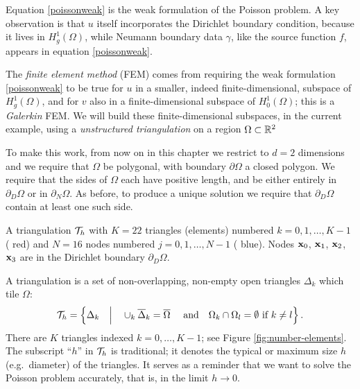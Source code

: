 Equation \eqref{poissonweak} is the weak formulation of the Poisson problem.  A key observation is that $u$ itself incorporates the Dirichlet boundary condition, because it lives in $H_g^1(\Omega)$, while Neumann boundary data $\gamma$, like the source function $f$, appears in equation \eqref{poissonweak}.

The \emph{finite element method} (FEM) comes from requiring the weak formulation  \eqref{poissonweak} to be true for $u$ in a smaller, indeed finite-dimensional, subspace of $H_g^1(\Omega)$, and for $v$ also in a finite-dimensional subspace of $H_0^1(\Omega)$; this is a \emph{Galerkin} FEM.  We will build these finite-dimensional subspaces, in the current example, using a \emph{unstructured triangulation} on a region $\Omega\subset \mathbb{R}^2$

To make this work, from now on in this chapter we restrict to $d=2$ dimensions and we require that $\Omega$ be polygonal, with boundary $\partial\Omega$ a closed polygon.  We require that the sides of $\Omega$ each have positive length, and be either entirely in $\partial_D\Omega$ or in $\partial_N\Omega$.  As before, to produce a unique solution we require that $\partial_D\Omega$ contain at least one such side.

\begin{marginfigure}

\caption{A triangulation $\mathcal{T}_h$ with $K=22$ triangles (elements) numbered $k=0,1,\dots,K-1$ ({\color{red} red}) and $N=16$ nodes numbered $j=0,1,\dots,N-1$  ({\color{blue} blue}).  Nodes $\mathbf{x}_0$, $\mathbf{x}_1$, $\mathbf{x}_2$, $\mathbf{x}_3$ are in the Dirichlet boundary $\partial_D\Omega$.}
\label{fig:number-elements}
\end{marginfigure}

A triangulation is a set of non-overlapping, non-empty open triangles $\Delta_k$ which tile $\Omega$:
\begin{equation*}
\mathcal{T}_h = \left\{\Delta_k \quad\Big|\quad \cup_k \overline{\Delta}_k = \overline{\Omega} \quad \text{ and} \quad \Omega_k \cap \Omega_l = \emptyset \text{ if } k\ne l\right\}.
\end{equation*}
There are $K$ triangles indexed $k=0,\dots,K-1$; see Figure \ref{fig:number-elements}.  The subscript ``$h$'' in $\mathcal{T}_h$ is traditional; it denotes the typical or maximum size $h$ (e.g.~diameter) of the triangles.  It serves as a reminder that we want to solve the Poisson problem accurately, that is, in the limit $h\to 0$.

